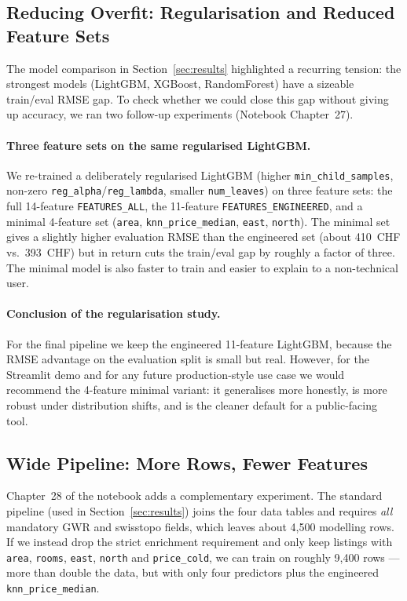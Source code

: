 \documentclass[11pt,a4paper]{article}
\begin{document}
\subsection{Reducing Overfit: Regularisation and Reduced Feature Sets}
\label{sec:regularised}
The model comparison in Section~\ref{sec:results} highlighted a recurring tension: the strongest models (LightGBM, XGBoost, RandomForest) have a sizeable train/eval RMSE gap. To check whether we could close this gap without giving up accuracy, we ran two follow-up experiments (Notebook Chapter~27).

\paragraph{Three feature sets on the same regularised LightGBM.}
We re-trained a deliberately regularised LightGBM (higher \texttt{min\_child\_samples}, non-zero \texttt{reg\_alpha}/\texttt{reg\_lambda}, smaller \texttt{num\_leaves}) on three feature sets: the full 14-feature \texttt{FEATURES\_ALL}, the 11-feature \texttt{FEATURES\_ENGINEERED}, and a minimal 4-feature set (\texttt{area}, \texttt{knn\_price\_median}, \texttt{east}, \texttt{north}). The minimal set gives a slightly higher evaluation RMSE than the engineered set (about 410~CHF vs.\ 393~CHF) but in return cuts the train/eval gap by roughly a factor of three. The minimal model is also faster to train and easier to explain to a non-technical user.

\paragraph{Conclusion of the regularisation study.}
For the final pipeline we keep the engineered 11-feature LightGBM, because the RMSE advantage on the evaluation split is small but real. However, for the Streamlit demo and for any future production-style use case we would recommend the 4-feature minimal variant: it generalises more honestly, is more robust under distribution shifts, and is the cleaner default for a public-facing tool.

\subsection{Wide Pipeline: More Rows, Fewer Features}
\label{sec:wide}
Chapter~28 of the notebook adds a complementary experiment. The standard pipeline (used in Section~\ref{sec:results}) joins the four data tables and requires \emph{all} mandatory GWR and swisstopo fields, which leaves about 4{,}500 modelling rows. If we instead drop the strict enrichment requirement and only keep listings with \texttt{area}, \texttt{rooms}, \texttt{east}, \texttt{north} and \texttt{price\_cold}, we can train on roughly 9{,}400 rows — more than double the data, but with only four predictors plus the engineered \texttt{knn\_price\_median}.
\end{document}
